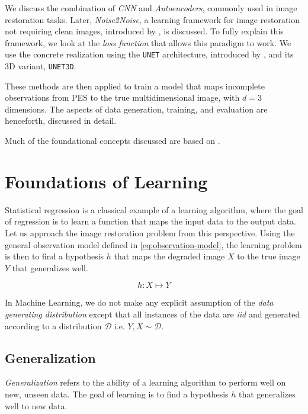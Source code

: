 We discuss the combination of \textit{\gls{CNN}} and \textit{Autoencoders}, commonly used in image restoration tasks. Later, \textit{Noise2Noise}, a learning framework for image restoration not requiring clean images, introduced by \citeauthor{lehtinenNoise2NoiseLearningImage2018}, is discussed. To fully explain this framework, we look at the \textit{loss function} that allows this paradigm to work. We use the concrete realization using the \texttt{UNET} architecture, introduced by \citeauthor{ronnebergerUNetConvolutionalNetworks}, and its 3D variant, \texttt{UNET3D}.

These methods are then applied to train a model that maps incomplete observations from \gls{PES} to the true multidimensional image, with $d=3$ dimensions. The aspects of data generation, training, and evaluation are henceforth, discussed in detail.

Much of the foundational concepts discussed are based on \cite{shalev-shwartzUnderstandingMachineLearning2014a,jamesIntroductionStatisticalLearning2013,tibshiraniElementsStatisticalLearning,goodfellowDeepLearning2016}.

\section{Foundations of Learning}
Statistical regression is a classical example of a learning algorithm, where the goal of regression is to learn a function that maps the input data to the output data.
Let us approach the image restoration problem from this perspective. Using the general observation model defined in \cref{eq:observation-model}, the learning problem is then to find a hypothesis $h$ that maps the degraded image $X$ to the true image $Y$ that generalizes well.

\begin{equation}
    h: X \mapsto Y
\end{equation}

In Machine Learning, we do not make any explicit assumption of the \textit{data generating distribution} except that all instances of the data are \textit{\gls{iid}} and generated according to a distribution $\mathcal{D}$ i.e. $Y, X \sim \mathcal{D}$.

\subsection{Generalization}
\textit{Generalization} refers to the ability of a learning algorithm to perform well on new, unseen data. The goal of learning is to find a hypothesis $h$ that generalizes well to new data. 

